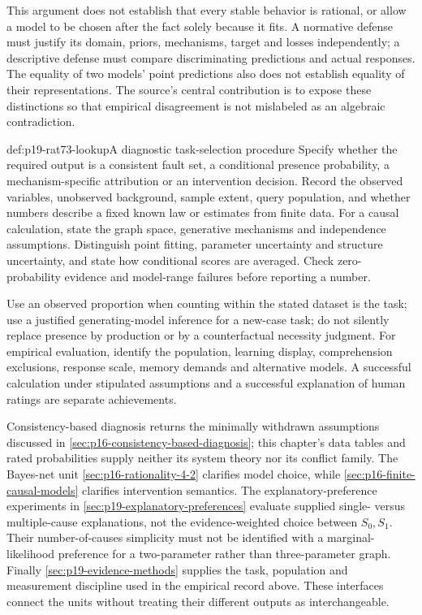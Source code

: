 This argument does not establish that every stable behavior is rational,
or allow a model to be chosen after the fact solely because it fits.
A normative defense must justify its domain, priors, mechanisms, target
and losses independently; a descriptive defense must compare discriminating
predictions and actual responses. The equality of two models' point
predictions also does not establish equality of their representations.
The source's central contribution is to expose these distinctions so that
empirical disagreement is not mislabeled as an algebraic contradiction.

\begin{hbmethod}{def:p19-rat73-lookup}{A diagnostic task-selection procedure}
Specify whether the required output is a consistent fault set, a conditional
presence probability, a mechanism-specific attribution or an intervention
decision. Record the observed variables, unobserved background, sample
extent, query population, and whether numbers describe a fixed known law
or estimates from finite data. For a causal calculation, state the graph
space, generative mechanisms and independence assumptions. Distinguish
point fitting, parameter uncertainty and structure uncertainty, and state
how conditional scores are averaged. Check zero-probability evidence and
model-range failures before reporting a number.

Use an observed proportion when counting within the stated dataset is the
task; use a justified generating-model inference for a new-case task;
do not silently replace presence by production or by a counterfactual
necessity judgment. For empirical evaluation, identify the population,
learning display, comprehension exclusions, response scale, memory demands
and alternative models. A successful calculation under stipulated
assumptions and a successful explanation of human ratings are separate
achievements.
\end{hbmethod}

Consistency-based diagnosis returns the minimally withdrawn assumptions
discussed in \cref{sec:p16-consistency-based-diagnosis}; this chapter's
data tables and rated probabilities supply neither its system theory nor
its conflict family. The Bayes-net unit
\cref{sec:p16-rationality-4-2} clarifies model choice, while
\cref{sec:p16-finite-causal-models} clarifies intervention semantics.
The explanatory-preference experiments in
\cref{sec:p19-explanatory-preferences} evaluate supplied single- versus
multiple-cause explanations, not the evidence-weighted choice between
\(S_0,S_1\). Their number-of-causes simplicity must not be identified
with a marginal-likelihood preference for a two-parameter rather than
three-parameter graph. Finally \cref{sec:p19-evidence-methods} supplies
the task, population and measurement discipline used in the empirical
record above. These interfaces connect the units without treating their
different outputs as interchangeable.

